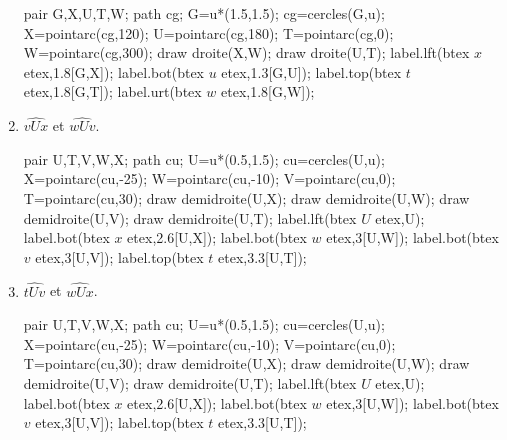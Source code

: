 \begin{exercice*}
\begin{multicols}{2}
\begin{enumerate}
\begin{Geometrie}[CoinHD={(4u,3.5u)}]
                pair G,X,U,T,W;
                path cg;
                G=u*(1.5,1.5);
                cg=cercles(G,u);
                X=pointarc(cg,120);
                U=pointarc(cg,180);
                T=pointarc(cg,0);
                W=pointarc(cg,300);
                draw droite(X,W);
                draw droite(U,T);
                label.lft(btex $x$ etex,1.8[G,X]);
                label.bot(btex $u$ etex,1.3[G,U]);
                label.top(btex $t$ etex,1.8[G,T]);
                label.urt(btex $w$ etex,1.8[G,W]);
            \end{Geometrie}
            \columnbreak
            \item $\widehat{vUx}$ et $\widehat{wUv}$.\par
            \hspace*{-5mm}
            \begin{Geometrie}[CoinHD={(4u,3.5u)}]
                pair U,T,V,W,X;
                path cu;
                U=u*(0.5,1.5);
                cu=cercles(U,u);
                X=pointarc(cu,-25);
                W=pointarc(cu,-10);
                V=pointarc(cu,0);
                T=pointarc(cu,30);
                draw demidroite(U,X);
                draw demidroite(U,W);
                draw demidroite(U,V);
                draw demidroite(U,T);
                label.lft(btex $U$ etex,U);
                label.bot(btex $x$ etex,2.6[U,X]);            
                label.bot(btex $w$ etex,3[U,W]);
                label.bot(btex $v$ etex,3[U,V]);
                label.top(btex $t$ etex,3.3[U,T]);            
            \end{Geometrie}
            \item $\widehat{tUv}$ et $\widehat{wUx}$.\par
            \hspace*{-5mm}
            \begin{Geometrie}[CoinHD={(4u,3.5u)}]
                pair U,T,V,W,X;
                path cu;
                U=u*(0.5,1.5);
                cu=cercles(U,u);
                X=pointarc(cu,-25);
                W=pointarc(cu,-10);
                V=pointarc(cu,0);
                T=pointarc(cu,30);
                draw demidroite(U,X);
                draw demidroite(U,W);
                draw demidroite(U,V);
                draw demidroite(U,T);
                label.lft(btex $U$ etex,U);
                label.bot(btex $x$ etex,2.6[U,X]);            
                label.bot(btex $w$ etex,3[U,W]);
                label.bot(btex $v$ etex,3[U,V]);
                label.top(btex $t$ etex,3.3[U,T]);            

\end{Geometrie}
\end{enumerate}
\end{multicols}
\end{exercice*}
